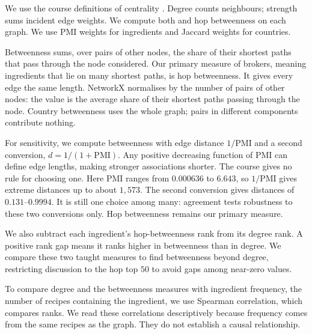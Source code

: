 We use the course definitions of centrality \cite{quercini2026}. Degree counts
neighbours; strength sums incident edge weights. We compute both and hop
betweenness on each graph. We use PMI weights for ingredients and Jaccard
weights for countries.

Betweenness sums, over pairs of other nodes, the share of their shortest
paths that pass through the node considered. Our primary measure of brokers,
meaning ingredients that lie on many shortest paths, is hop betweenness.
It gives every edge the same length. NetworkX normalises by the number of
pairs of other nodes: the value is the average share of their shortest paths
passing through the node. Country betweenness uses the whole graph; pairs
in different components contribute nothing.

For sensitivity, we compute betweenness with edge distance $1/\mathrm{PMI}$
and a second conversion, $d=1/(1+\mathrm{PMI})$. Any positive decreasing
function of PMI can define edge lengths, making stronger associations shorter.
The course gives no rule for choosing one. Here PMI ranges from $0.000636$
to $6.643$, so $1/\mathrm{PMI}$ gives extreme distances up to about $1{,}573$.
The second conversion gives distances of $0.131$--$0.9994$. It is still one
choice among many: agreement tests robustness to these two conversions only.
Hop betweenness remains our primary measure.

We also subtract each ingredient's hop-betweenness rank from its degree rank.
A positive rank gap means it ranks higher in betweenness than in degree.
We compare these two taught measures to find betweenness beyond degree,
restricting discussion to the hop top $50$ to avoid gaps among near-zero values.

To compare degree and the betweenness measures with ingredient frequency,
the number of recipes containing the ingredient, we use Spearman
correlation, which compares ranks. We read these correlations descriptively
because frequency comes from the same recipes as the graph. They do not
establish a causal relationship.
